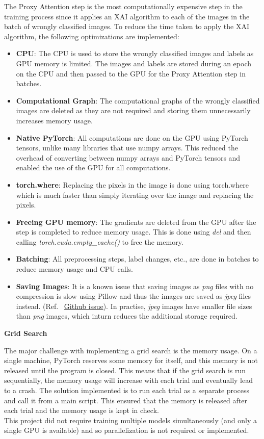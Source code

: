 \documentclass[a4paper,11pt,openright]{book}
\begin{document}
The Proxy Attention step is the most computationally expensive step in the training process since it applies an XAI algorithm to each of the images in the batch of wrongly classified images. To reduce the time taken to apply the XAI algorithm, the following optimizations are implemented:
\begin{itemize}
    \item \textbf{CPU}: The CPU is used to store the wrongly classified images and labels as GPU memory is limited. The images and labels are stored during an epoch on the CPU and then passed to the GPU for the Proxy Attention step in batches.
    \item \textbf{Computational Graph}: The computational graphs of the wrongly classified images are deleted as they are not required and storing them unnecessarily increases memory usage.
    \item \textbf{Native PyTorch}: All computations are done on the GPU using PyTorch tensors, unlike many libraries that use numpy arrays. This reduced the overhead of converting between numpy arrays and PyTorch tensors and enabled the use of the GPU for all computations.
    \item \textbf{torch.where}: Replacing the pixels in the image is done using torch.where which is much faster than simply iterating over the image and replacing the pixels.
    \item \textbf{Freeing GPU memory}: The gradients are deleted from the GPU after the step is completed to reduce memory usage. This is done using \textit{del} and then calling \textit{torch.cuda.empty\_cache()} to free the memory.
    \item \textbf{Batching}: All preprocessing steps, label changes, etc., are done in batches to reduce memory usage and CPU calls.
    \item \textbf{Saving Images}: It is a known issue that saving images as \textit{png} files with no compression is slow using Pillow and thus the images are saved as \textit{jpeg} files instead. (Ref. ~\href{https://github.com/python-pillow/Pillow/issues/1211}{Github issue}). In practise, \textit{jpeg} images have smaller file sizes than \textit{png} images, which inturn reduces the additional storage required.

\end{itemize}

\textbf{Grid Search}

The major challenge with implementing a grid search is the memory usage. On a single machine, PyTorch reserves some memory for itself, and this memory is not released until the program is closed. This means that if the grid search is run sequentially, the memory usage will increase with each trial and eventually lead to a crash. The solution implemented is to run each trial as a separate process and call it from a main script. This ensured that the memory is released after each trial and the memory usage is kept in check.\\
This project did not require training multiple models simultaneously (and only a single GPU is available) and so parallelization is not required or implemented.
\end{document}

